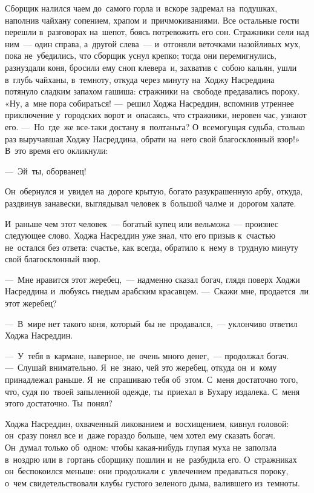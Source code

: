 \documentclass[12pt,a4paper]{book}
\begin{document}
Сборщик налился чаем до~самого горла и~вскоре задремал на~подушках, наполнив чайхану сопением, храпом и~причмокиваниями. Все остальные гости перешли в~разговорах на~шепот, боясь потревожить его сон. Стражники сели над ним~— один справа, а~другой слева~— и~отгоняли веточками назойливых мух, пока не~убедились, что сборщик уснул крепко; тогда они перемигнулись, разнуздали коня, бросили ему сноп клевера~и, захватив с~собою кальян, ушли в~глубь чайханы, в~темноту, откуда через минуту на~Ходжу Насреддина потянуло сладким запахом гашиша: стражники на~свободе предавались пороку. «Ну, а~мне пора собираться! —~решил Ходжа Насреддин, вспомнив утреннее приключение у~городских ворот и~опасаясь, что стражники, неровен час, узнают его. —~Но~где~же все-таки достану я~полтаньга? О~всемогущая судьба, столько раз выручавшая Ходжу Насреддина, обрати на~него свой благосклонный взор!» В~это время его окликнули:

—~Эй~ты, оборванец!

Он~обернулся и~увидел на~дороге крытую, богато разукрашенную арбу, откуда, раздвинув занавески, выглядывал человек в~большой чалме и~дорогом халате.

И~раньше чем этот человек~— богатый купец или вельможа~— произнес следующее слово. Ходжа Насреддин уже знал, что его призыв к~счастью не~остался без ответа: счастье, как всегда, обратило к~нему в~трудную минуту свой благосклонный взор.

—~Мне нравится этот жеребец,~— надменно сказал богач, глядя поверх Ходжи Насреддина и~любуясь гнедым арабским красавцем. —~Скажи мне, продается~ли этот жеребец?

—~В~мире нет такого коня, который~бы не~продавался,~— уклончиво ответил Ходжа Насреддин.

—~У~тебя в~кармане, наверное, не~очень много денег,~— продолжал богач. —~Слушай внимательно. Я~не~знаю, чей это жеребец, откуда он~и~кому принадлежал раньше. Я~не~спрашиваю тебя об~этом. С~меня достаточно того, что, судя по~твоей запыленной одежде, ты~приехал в~Бухару издалека. С~меня этого достаточно. Ты~понял?

Ходжа Насреддин, охваченный ликованием и~восхищением, кивнул головой: он~сразу понял все и~даже гораздо больше, чем хотел ему сказать богач. Он~думал только об~одном: чтобы какая-нибудь глупая муха не~заползла в~ноздрю или в~гортань сборщику пошлин и~не~разбудила его. О~стражниках он~беспокоился меньше: они продолжали с~увлечением предаваться пороку, о~чем свидетельствовали клубы густого зеленого дыма, валившего из~темноты.
\end{document}
